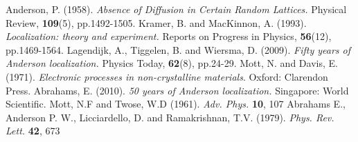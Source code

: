 \documentclass[10pt,a4paper]{article}
\begin{document}
\clearpage
\begin{thebibliography}{99}
Anderson, P. (1958). \emph{Absence of Diffusion in Certain Random Lattices.} Physical Review, \textbf{109}(5), pp.1492-1505.
Kramer, B. and MacKinnon, A. (1993). \emph{Localization: theory and experiment.} Reports on Progress in Physics, \textbf{56}(12), pp.1469-1564.
Lagendijk, A., Tiggelen, B. and Wiersma, D. (2009). \emph{Fifty years of Anderson localization.} Physics Today, \textbf{62}(8), pp.24-29.
Mott, N. and Davis, E. (1971). \emph{Electronic processes in non-crystalline materials}. Oxford: Clarendon Press.
Abrahams, E. (2010). \emph{50 years of Anderson localization.} Singapore: World Scientific.
Mott, N.F and Twose, W.D (1961). \emph{Adv. Phys.} \textbf{10}, 107
Abrahams E., Anderson P. W., Licciardello, D. and Ramakrishnan, T.V. (1979). \emph{Phys. Rev. Lett.} \textbf{42}, 673
\end{thebibliography}
\end{document}
